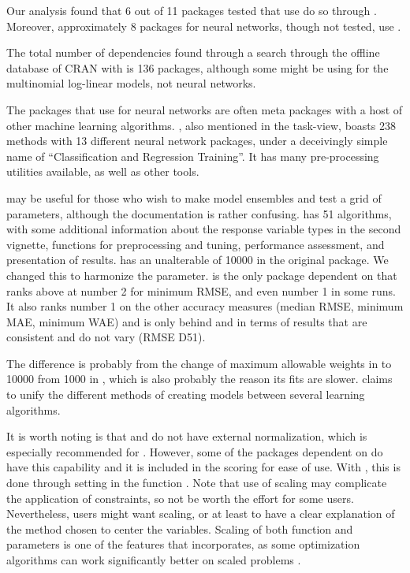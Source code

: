 Our analysis found that 6 out of 11 packages tested that use
 do so through . Moreover, approximately 8
packages for neural networks, though not tested, use .

The total number of  dependencies found through a search
through the offline database of CRAN with  is 136
packages, although some might be using  for the multinomial
log-linear models, not neural networks.

The packages that use  for neural networks are often meta
packages with a host of other machine learning algorithms. 
\citep{R-caret}, also mentioned in the task-view, boasts 238 methods
with 13 different neural network packages, under a deceivingly simple
name of ``Classification and Regression Training''. It has many
pre-processing utilities available, as well as other tools.

 \citep{R-EnsembleBase} may be useful for those
who wish to make model ensembles and test a grid of parameters, although
the documentation is rather confusing. 
\citep{R-MachineShop} has 51 algorithms, with some additional
information about the response variable types in the second vignette,
functions for preprocessing and tuning, performance assessment, and
presentation of results.  \citep{R-radiant.model}
has an unalterable  of 10000 in the original package. We
changed this to harmonize the  parameter. 
\citep{R-rminer} is the only package dependent on  that ranks
above  at number 2 for minimum RMSE, and even number 1 in some
runs. It also ranks number 1 on the other accuracy measures (median
RMSE, minimum MAE, minimum WAE) and is only behind 
and  in terms of results that are consistent and do not
vary (RMSE D51).

The difference is probably from the change of maximum allowable weights
in  to 10000 from 1000 in , which is also probably
the reason its fits are slower.  \citep{R-traineR}
claims to unify the different methods of creating models between several
learning algorithms.

It is worth noting is that  and  do not have
external normalization, which is especially recommended for
. However, some of the packages dependent on  do
have this capability and it is included in the scoring for ease of use.
With , this is done through setting 
in the function . Note that use of scaling may
complicate the application of constraints, so not be worth the effort
for some users. Nevertheless, users might want scaling, or at least to
have a clear explanation of the method chosen to center the variables.
Scaling of both function and parameters is one of the features that
 \citep{R-optimx} incorporates, as some optimization
algorithms can work significantly better on scaled problems
\citep{Nash-nlpor14}.

